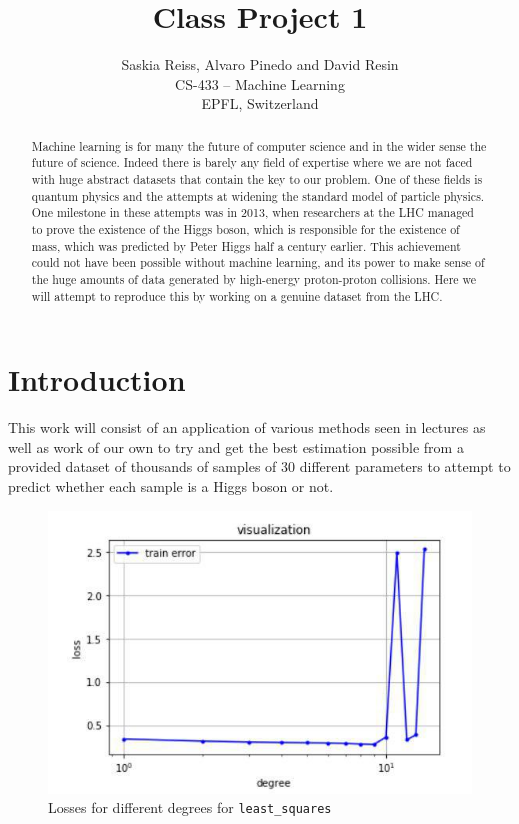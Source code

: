 \documentclass[10pt,conference,compsocconf]{IEEEtran}
\begin{document}
\title{Class Project 1}

\author{%
  Saskia Reiss, Alvaro Pinedo and David Resin\\%
  CS-433 -- Machine Learning\\EPFL, Switzerland%
}

\maketitle

\begin{abstract}
Machine learning is for many the future of computer science and in the wider sense the future of science. Indeed there is barely any field of expertise where we are not faced with huge abstract datasets that contain the key to our problem. One of these fields is quantum physics and the attempts at widening the standard model of particle physics. One milestone in these attempts was in 2013, when researchers at the LHC managed to prove the existence of the Higgs boson, which is responsible for the existence of mass, which was predicted by Peter Higgs half a century earlier. This achievement could not have been possible without machine learning, and its power to make sense of the huge amounts of data generated by high-energy proton-proton collisions. Here we will attempt to reproduce this by working on a genuine dataset from the LHC.
\end{abstract}
\section{Introduction}
This work will consist of an application of various methods seen in lectures as well as work of our own to try and get the best estimation possible from a provided dataset of thousands of samples of 30 different parameters to attempt to predict whether each sample is a Higgs boson or not.
\begin{figure}[h!]
\includegraphics[width=.5\textwidth]{losses_least_squares.jpg}
\caption{Losses for different degrees for \texttt{least\_squares}}
\end{figure}
\end{document}
